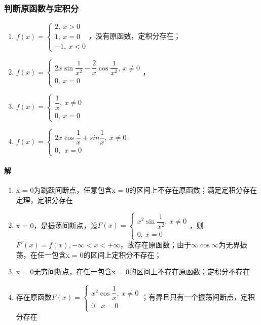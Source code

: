 \subsubsection{判断原函数与定积分}
\begin{enumerate}
    \item \(f(x) = \begin{cases}
    2,\ x > 0 \\ 
    1,\ x = 0 \\ 
    -1,\ x < 0
    \end{cases}\)，没有原函数，定积分存在；
    \item \(f(x) = \begin{cases}
        2x\sin\dfrac{1}{x^2} - \dfrac{2}{x}\cos\dfrac{1}{x^2},\ x \neq 0 \\ 
        0,\ x = 0
    \end{cases}\)，
    \item \(f(x) = \begin{cases}
        \dfrac{1}{x},\ x \neq 0 \\ 
        0,\ x = 0
    \end{cases}\)
    \item \(f(x) = \begin{cases}
        2x\cos\dfrac{1}{x} + sin\dfrac{1}{x},\ x \neq 0 \\ 
        0,\ \ x = 0
    \end{cases}\)
\end{enumerate}

\paragraph{解}
\begin{enumerate}
    \item x = 0为跳跃间断点，任意包含x = 0的区间上不存在原函数；满足定积分存在定理，定积分存在
    \item x = 0，是振荡间断点，设\(F(x) = \begin{cases}
        x^2\sin\dfrac{1}{x^2},\ x \neq 0 \\ 
        0,\ x = 0
    \end{cases}\)，则\(F'(x) = f(x), -\infty < x < +\infty\)，故存在原函数；由于\(\infty\cos\infty\)为无界振荡，在任一包含x = 0的区间上定积分不存在；
    \item x = 0无穷间断点，在任一包含x = 0的区间上不存在原函数；定积分不存在
    \item 存在原函数\(F(x) = \begin{cases}
        x^2\cos\dfrac{1}{x},\ x \neq 0 \\ 
        0,\ \ x = 0
    \end{cases}\)；有界且只有一个振荡间断点，定积分存在
\end{enumerate}

